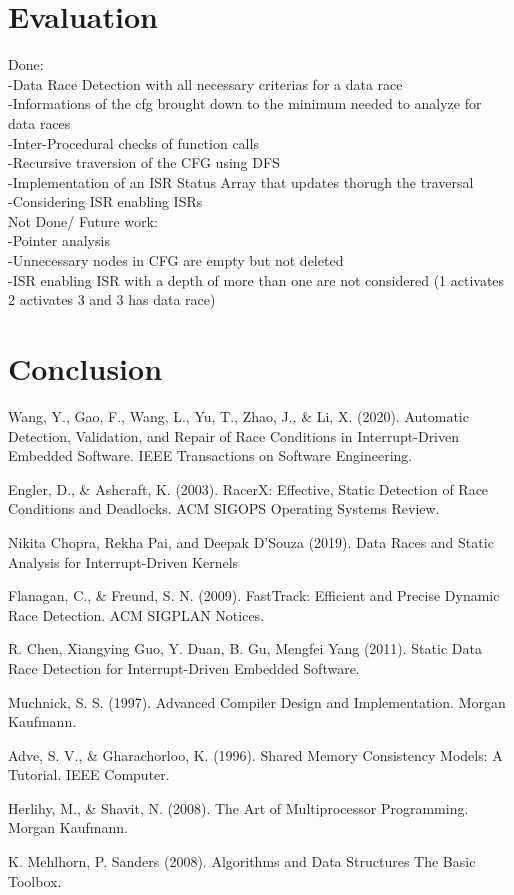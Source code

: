 \documentclass[
fancyheadings, %
%
%
]{stsreprt}
\begin{document}
{\chapter{Evaluation}

 Done:\\
 -Data Race Detection with all necessary criterias for a data race\\
 -Informations of the cfg brought down to the minimum needed to analyze for data races\\
 -Inter-Procedural checks of function calls\\
 -Recursive traversion of the CFG using DFS\\
 -Implementation of an ISR Status Array that updates thorugh the traversal\\
 -Considering ISR enabling ISRs\\
 
 
 Not Done/ Future work:\\
 -Pointer analysis\\
 -Unnecessary nodes in CFG are empty but not deleted\\
 -ISR enabling ISR with a depth of more than one are not considered (1 activates 2 activates 3 and 3 has data race)\\
\chapter{Conclusion}

\appendix
}
\backmatter{}
\begin{thebibliography}{9}
	Wang, Y., Gao, F., Wang, L., Yu, T., Zhao, J., \& Li, X. (2020). Automatic Detection, Validation, and Repair of Race Conditions in Interrupt-Driven Embedded Software. IEEE Transactions on Software Engineering.
	
	Engler, D., \& Ashcraft, K. (2003). RacerX: Effective, Static Detection of Race Conditions and Deadlocks. ACM SIGOPS Operating Systems Review.
	
	Nikita Chopra, Rekha Pai, and Deepak D’Souza (2019). Data Races and Static Analysis for Interrupt-Driven Kernels
	
	Flanagan, C., \& Freund, S. N. (2009). FastTrack: Efficient and Precise Dynamic Race Detection. ACM SIGPLAN Notices.
	
	R. Chen, Xiangying Guo, Y. Duan, B. Gu, Mengfei Yang (2011). Static Data Race Detection for Interrupt-Driven Embedded Software.
			
	Muchnick, S. S. (1997). Advanced Compiler Design and Implementation. Morgan Kaufmann.
	
	Adve, S. V., \& Gharachorloo, K. (1996). Shared Memory Consistency Models: A Tutorial. IEEE Computer.
	
	Herlihy, M., \& Shavit, N. (2008). The Art of Multiprocessor Programming. Morgan Kaufmann.
	
	K. Mehlhorn, P. Sanders (2008). Algorithms and Data Structures The Basic Toolbox.
\end{thebibliography}
\end{document}
